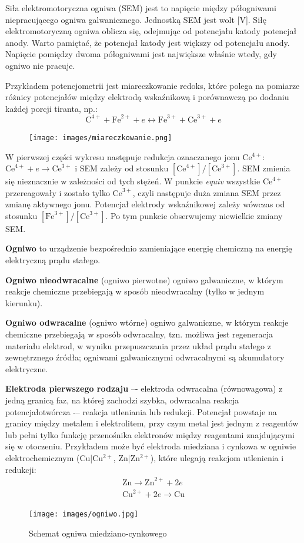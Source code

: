 \documentclass{article}
\begin{document}
Siła elektromotoryczna ogniwa (SEM) jest to napięcie między półogniwami niepracującego ogniwa galwanicznego.
Jednostką SEM jest wolt [V]. Siłę elektromotoryczną ogniwa oblicza się, odejmując od potencjału katody potencjał anody. Warto pamiętać, że potencjał katody jest większy od potencjału anody. Napięcie pomiędzy dwoma półogniwami jest największe właśnie wtedy, gdy ogniwo nie pracuje.

Przykładem potencjometrii jest miareczkowanie redoks, które polega na pomiarze różnicy potencjałów między elektrodą wskaźnikową i porównawczą po dodaniu każdej porcji tiranta, np.:
\begin{equation*}
    \text{C}^{4+}+\text{Fe}^{2+}+e\longleftrightarrow\text{Fe}^{3+}+\text{Ce}^{3+}+e
\end{equation*}
\begin{figure}[H]
    \centering
    \texttt{[image: images/miareczkowanie.png]}
\end{figure}
 
W pierwszej części wykresu następuje redukcja oznaczanego jonu Ce$^{4+}$: $\text{Ce}^{4+}+e \rightarrow \text{Ce}^{3+}$ i SEM zależy od stosunku $[\text{Ce}^{4+}]/[\text{Ce}^{3+}]$. SEM zmienia się nieznacznie w zależności od tych stężeń. W punkcie \textit{equiv} wszystkie $\text{Ce}^{4+}$ przereagowały i zostało tylko $\text{Ce}^{3+}$, czyli następuje duża zmiana SEM przez zmianę aktywnego jonu. Potencjał elektrody wskaźnikowej zależy wówczas od stosunku $[\text{Fe}^{3+}]/[\text{Ce}^{3+}]$. Po tym punkcie obserwujemy niewielkie zmiany SEM.

\textbf{Ogniwo} to urządzenie bezpośrednio zamieniające energię chemiczną na energię elektryczną prądu stałego.

\textbf{Ogniwo nieodwracalne} (ogniwo pierwotne) ogniwo galwaniczne, w którym reakcje chemiczne przebiegają
w sposób nieodwracalny (tylko w jednym kierunku).

\textbf{Ogniwo odwracalne} (ogniwo wtórne) ogniwo galwaniczne, w którym reakcje chemiczne przebiegają w sposób
odwracalny, tzn. możliwa jest regeneracja materiału elektrod, w wyniku przepuszczania przez układ prądu stałego z zewnętrznego źródła; ogniwami galwanicznymi odwracalnymi są akumulatory elektryczne.

\textbf{Elektroda pierwszego rodzaju} –- elektroda odwracalna (równowagowa) z jedną granicą faz, na której zachodzi szybka, odwracalna reakcja potencjałotwórcza -– reakcja utleniania lub redukcji. Potencjał powstaje na granicy między metalem i elektrolitem, przy czym metal jest jednym z reagentów lub pełni tylko funkcję przenośnika elektronów między reagentami znajdującymi się w otoczeniu. Przykładem może być elektroda miedziana i cynkowa w ogniwie elektrochemicznym (Cu|Cu$^{2+}$, Zn|Zn$^{2+}$), które ulegają reakcjom utlenienia i redukcji:
\begin{gather*}
    \text{Zn} \rightarrow \text{Zn}^{2+}+2e\\
    \text{Cu}^{2+} +2e \rightarrow \text{Cu}
\end{gather*}
\begin{figure}[H]
    \centering
    \texttt{[image: images/ogniwo.jpg]}
    \caption{Schemat ogniwa miedziano-cynkowego}
\end{figure}
\end{document}
